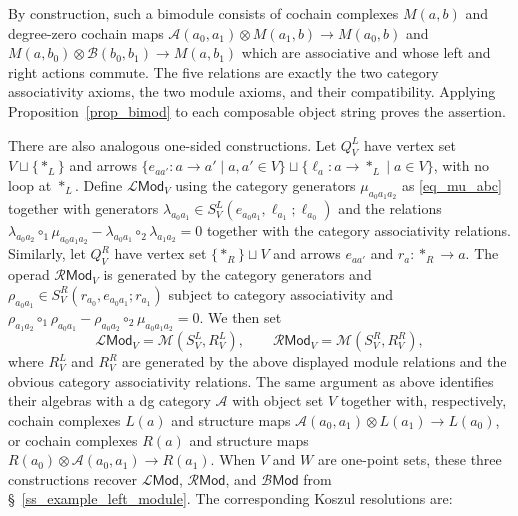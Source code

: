 \documentclass[11pt,letterpaper]{article}
\numberwithin{equation}{section}
\theoremstyle{plain}
\theoremstyle{definition}
\theoremstyle{remark}
\begin{document}
	By construction, such a bimodule consists
	of cochain complexes $M(a,b)$ and degree-zero cochain maps
	$\mathcal A(a_0,a_1)\otimes M(a_1,b)
	\to M(a_0,b)$ and $M(a,b_0)\otimes\mathcal B(b_0,b_1)
	\to M(a,b_1)$
	which are associative and whose left and right actions commute.
	The five relations are exactly the two category associativity axioms, the two module axioms, and their compatibility. Applying Proposition~\ref{prop_bimod} to each composable object string proves the assertion.

	There are also analogous one-sided constructions.  Let $Q^L_V$ have vertex
	set $V\sqcup\{\ast_L\}$ and arrows
	$\{e_{aa'}:a\to a'\mid a,a'\in V\}
	\sqcup
	\{\ell_a:a\to\ast_L\mid a\in V\}$,
	with no loop at $\ast_L$.  Define $\mathscr L\mathsf{Mod}_V$ using the category generators $\mu_{a_0a_1a_2}$ as \eqref{eq_mu_abc} together with generators
	$\lambda_{a_0a_1}
	\in S^L_V(e_{a_0a_1},\ell_{a_1};\ell_{a_0})$
	and the relations
	$\lambda_{a_0a_2}\circ_1\mu_{a_0a_1a_2}-\lambda_{a_0a_1}\circ_2\lambda_{a_1a_2}=0$ together with the category associativity relations.
	Similarly, let
	$Q^R_V$ have vertex set $\{\ast_R\}\sqcup V$ and arrows $e_{aa'}$ and
	$r_a:\ast_R\to a$.  The operad $\mathscr R\mathsf{Mod}_V$ is generated
	by the category generators and
	$\rho_{a_0a_1}
	\in S^R_V(r_{a_0},e_{a_0a_1};r_{a_1})$
	subject to category associativity and
	$\rho_{a_1a_2}\circ_1\rho_{a_0a_1}-\rho_{a_0a_2}\circ_2\mu_{a_0a_1a_2}=0$.
	We then set
	\[
	\mathscr L\mathsf{Mod}_V=\mathscr M(S^L_V,R^L_V),
	\qquad
	\mathscr R\mathsf{Mod}_V=\mathscr M(S^R_V,R^R_V),
	\]
	where $R^L_V$ and $R^R_V$ are generated by the above displayed module
	relations and the obvious category associativity relations.
	The same argument as above identifies their algebras with a dg category
	$\mathcal A$ with object set $V$ together with, respectively, cochain
	complexes $L(a)$ and structure maps
	$\mathcal A(a_0,a_1)\otimes L(a_1)\to L(a_0)$,
	or cochain complexes $R(a)$ and structure maps
	$R(a_0)\otimes\mathcal A(a_0,a_1)\longrightarrow R(a_1)$.
	When $V$ and $W$ are one-point sets, these three constructions recover
	$\mathscr L\mathsf{Mod}$, $\mathscr R\mathsf{Mod}$, and
	$\mathscr B\mathsf{Mod}$ from \S~\ref{ss_example_left_module}.
	The corresponding Koszul resolutions are:
\end{document}
